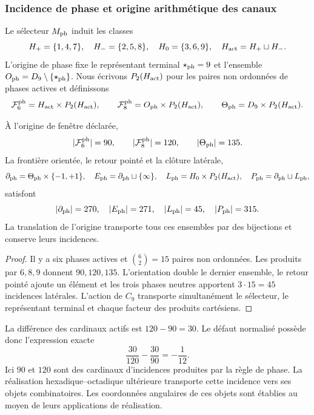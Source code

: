 \subsubsection{Incidence de phase et origine arithmétique des canaux}

Le sélecteur \(M_{\rm ph}\) induit les classes
\[
 H_+=\{1,4,7\},\quad H_-=\{2,5,8\},\quad
 H_0=\{3,6,9\},\quad H_{\rm act}=H_+\sqcup H_-.
\]
L'origine de phase fixe le représentant terminal \(\star_{\rm ph}=9\) et l'ensemble \(O_{\rm ph}=D_9\setminus\{\star_{\rm ph}\}\). Nous écrivons \(P_2(H_{\rm act})\) pour les paires non ordonnées de phases actives et définissons
\[
 \mathcal F_6^{\rm ph}=H_{\rm act}\times P_2(H_{\rm act}),\qquad
 \mathcal F_8^{\rm ph}=O_{\rm ph}\times P_2(H_{\rm act}),\qquad
 \Theta_{\rm ph}=D_9\times P_2(H_{\rm act}).
\]

\begin{theorem}
\label{ii:ii:tpk-semicorona}
À l'origine de fenêtre déclarée,
\[
 |\mathcal F_6^{\rm ph}|=90,\qquad
 |\mathcal F_8^{\rm ph}|=120,\qquad
 |\Theta_{\rm ph}|=135.
\]
La frontière orientée, le retour pointé et la clôture latérale,
\[
 \partial_{\rm ph}=\Theta_{\rm ph}\times\{-1,+1\},\quad
 E_{\rm ph}=\partial_{\rm ph}\sqcup\{\infty\},\quad
 L_{\rm ph}=H_0\times P_2(H_{\rm act}),\quad
 P_{\rm ph}=\partial_{\rm ph}\sqcup L_{\rm ph},
\]
satisfont
\[
 |\partial_{\rm ph}|=270,\quad |E_{\rm ph}|=271,\quad
 |L_{\rm ph}|=45,\quad |P_{\rm ph}|=315.
\]
La translation de l'origine transporte tous ces ensembles par des bijections et conserve leurs incidences.
\end{theorem}
\begin{proof}
Il y a six phases actives et \(\binom62=15\) paires non ordonnées. Les produits par \(6,8,9\) donnent \(90,120,135\). L'orientation double le dernier ensemble, le retour pointé ajoute un élément et les trois phases neutres apportent \(3\cdot15=45\) incidences latérales. L'action de \(C_9\) transporte simultanément le sélecteur, le représentant terminal et chaque facteur des produits cartésiens.
\end{proof}

La différence des cardinaux actifs est \(120-90=30\). Le défaut normalisé possède donc l'expression exacte
\begin{equation}
 \frac{30}{120}-\frac{30}{90}=-\frac1{12}.
 \label{ii:ii:tpk-defecto-incidencia}
\end{equation}
Ici \(90\) et \(120\) sont des cardinaux d'incidences produites par la règle de phase. La réalisation hexadique--octadique ultérieure transporte cette incidence vers ses objets combinatoires. Les coordonnées angulaires de ces objets sont établies au moyen de leurs applications de réalisation.

